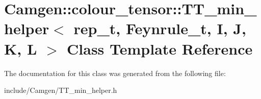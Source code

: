 \hypertarget{a00553}{}\section{Camgen\+:\+:colour\+\_\+tensor\+:\+:T\+T\+\_\+min\+\_\+helper$<$ rep\+\_\+t, Feynrule\+\_\+t, I, J, K, L $>$ Class Template Reference}
\label{a00553}


The documentation for this class was generated from the following file\+:\begin{DoxyCompactItemize}
\item 
include/\+Camgen/T\+T\+\_\+min\+\_\+helper.\+h\end{DoxyCompactItemize}
